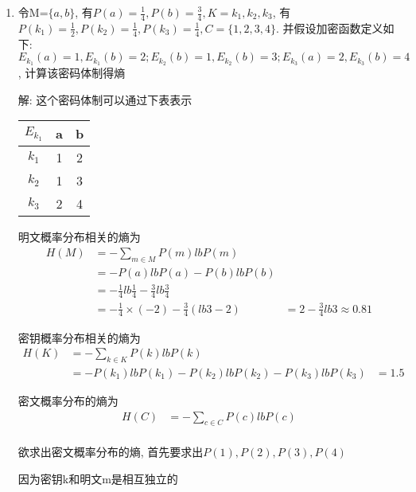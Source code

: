 \documentclass[UTF8]{ctexart}
\begin{document}
\begin{enumerate}
    \item 令M=$\{a, b\}$, 有$P(a)=\frac{1}{4}, P(b)=\frac{3}{4}, K={k_1, k_2, k_3}$, 有$P(k_1)=\frac{1}{2}, P(k_2)=\frac{1}{4}, P(k_3)=\frac{1}{4}, C=\{1,2,3,4\}$. 并假设加密函数定义如下:
    $E_{k_1}(a)=1, E_{k_1}(b)=2; E_{k_2}(b)=1, E_{k_2}(b)=3; E_{k_3}(a)=2, E_{k_3}(b)=4$, 计算该密码体制得熵

    解: 这个密码体制可以通过下表表示
    \begin{table}[h]
      \centering
      \begin{tabular}{|c|c|c|}
        \hline
        $E_{k_1}$ &a &b\\
        \hline
        $k_1$ &1 &2\\
        \hline
        $k_2$ &1 &3\\
        \hline
        $k_3$ &2 &4\\
        \hline
      \end{tabular}
    \end{table}

      明文概率分布相关的熵为
      $$
      \begin{aligned}
        H(M)&=-\sum\limits_{m\in M}P(m)lbP(m)\\
            &=-P(a)lbP(a)-P(b)lbP(b)\\
            &=-\frac{1}{4}lb\frac{1}{4}-\frac{3}{4}lb\frac{3}{4}\\
            &=-\frac{1}{4}\times (-2)-\frac{3}{4}(lb3 - 2)
            &=2-\frac{3}{4}lb3\approx 0.81
      \end{aligned}
      $$

      密钥概率分布相关的熵为
      $$
      \begin{aligned}
        H(K)&=-\sum\limits_{k\in K}P(k)lbP(k)\\
            &=-P(k_1)lbP(k_1)-P(k_2)lbP(k_2)-P(k_3)lbP(k_3)
            &=1.5
      \end{aligned}
      $$

      密文概率分布的熵为
      $$
      \begin{aligned}
        H(C)&=-\sum\limits_{c\in C}P(c)lbP(c)\\
      \end{aligned}
      $$

      欲求出密文概率分布的熵, 首先要求出$P(1), P(2), P(3), P(4)$

      因为密钥k和明文m是相互独立的


\end{enumerate}
\end{document}
